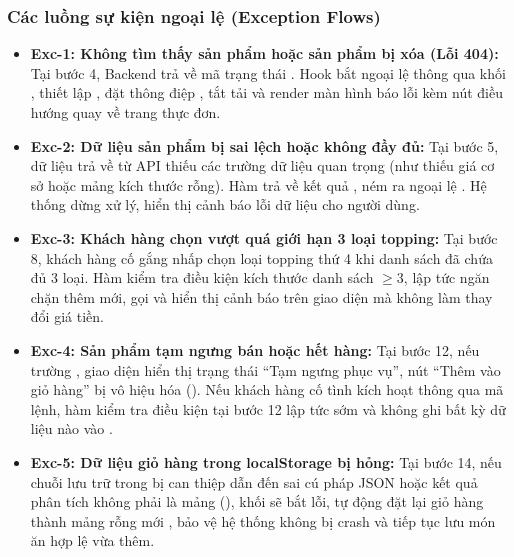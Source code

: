 \subsubsection{Các luồng sự kiện ngoại lệ (Exception Flows)}

\begin{itemize}[leftmargin=1.5em]
  \item \textbf{Exc-1: Không tìm thấy sản phẩm hoặc sản phẩm bị xóa (Lỗi 404):} Tại bước 4, Backend trả về mã trạng thái . Hook  bắt ngoại lệ thông qua khối , thiết lập , đặt thông điệp , tắt tải  và render màn hình báo lỗi kèm nút điều hướng quay về trang thực đơn.
  \item \textbf{Exc-2: Dữ liệu sản phẩm bị sai lệch hoặc không đầy đủ:} Tại bước 5, dữ liệu trả về từ API thiếu các trường dữ liệu quan trọng (như thiếu giá cơ sở  hoặc mảng kích thước  rỗng). Hàm  trả về kết quả , ném ra ngoại lệ . Hệ thống dừng xử lý, hiển thị cảnh báo lỗi dữ liệu cho người dùng.
  \item \textbf{Exc-3: Khách hàng chọn vượt quá giới hạn 3 loại topping:} Tại bước 8, khách hàng cố gắng nhấp chọn loại topping thứ 4 khi danh sách đã chứa đủ 3 loại. Hàm  kiểm tra điều kiện kích thước danh sách $\ge 3$, lập tức ngăn chặn thêm mới, gọi  và hiển thị cảnh báo trên giao diện mà không làm thay đổi giá tiền.
  \item \textbf{Exc-4: Sản phẩm tạm ngưng bán hoặc hết hàng:} Tại bước 12, nếu trường , giao diện hiển thị trạng thái ``Tạm ngưng phục vụ'', nút ``Thêm vào giỏ hàng'' bị vô hiệu hóa (). Nếu khách hàng cố tình kích hoạt thông qua mã lệnh, hàm kiểm tra điều kiện tại bước 12 lập tức  sớm và không ghi bất kỳ dữ liệu nào vào .
  \item \textbf{Exc-5: Dữ liệu giỏ hàng trong localStorage bị hỏng:} Tại bước 14, nếu chuỗi lưu trữ trong  bị can thiệp dẫn đến sai cú pháp JSON hoặc kết quả phân tích không phải là mảng (), khối  sẽ bắt lỗi, tự động đặt lại giỏ hàng thành mảng rỗng mới \code{[]}, bảo vệ hệ thống không bị crash và tiếp tục lưu món ăn hợp lệ vừa thêm.
\end{itemize}

